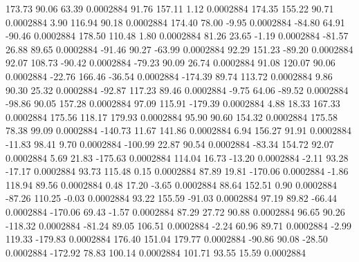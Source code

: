       173.73       90.06       63.39     0.0002884
       91.76      157.11        1.12     0.0002884
      174.35      155.22       90.71     0.0002884
        3.90      116.94       90.18     0.0002884
      174.40       78.00       -9.95     0.0002884
      -84.80       64.91      -90.46     0.0002884
      178.50      110.48        1.80     0.0002884
       81.26       23.65       -1.19     0.0002884
      -81.57       26.88       89.65     0.0002884
      -91.46       90.27      -63.99     0.0002884
       92.29      151.23      -89.20     0.0002884
       92.07      108.73      -90.42     0.0002884
      -79.23       90.09       26.74     0.0002884
       91.08      120.07       90.06     0.0002884
      -22.76      166.46      -36.54     0.0002884
     -174.39       89.74      113.72     0.0002884
        9.86       90.30       25.32     0.0002884
      -92.87      117.23       89.46     0.0002884
       -9.75       64.06      -89.52     0.0002884
      -98.86       90.05      157.28     0.0002884
       97.09      115.91     -179.39     0.0002884
        4.88       18.33      167.33     0.0002884
      175.56      118.17      179.93     0.0002884
       95.90       90.60      154.32     0.0002884
      175.58       78.38       99.09     0.0002884
     -140.73       11.67      141.86     0.0002884
        6.94      156.27       91.91     0.0002884
      -11.83       98.41        9.70     0.0002884
     -100.99       22.87       90.54     0.0002884
      -83.34      154.72       92.07     0.0002884
        5.69       21.83     -175.63     0.0002884
      114.04       16.73      -13.20     0.0002884
       -2.11       93.28      -17.17     0.0002884
       93.73      115.48        0.15     0.0002884
       87.89       19.81     -170.06     0.0002884
       -1.86      118.94       89.56     0.0002884
        0.48       17.20       -3.65     0.0002884
       88.64      152.51        0.90     0.0002884
      -87.26      110.25       -0.03     0.0002884
       93.22      155.59      -91.03     0.0002884
       97.19       89.82      -66.44     0.0002884
     -170.06       69.43       -1.57     0.0002884
       87.29       27.72       90.88     0.0002884
       96.65       90.26     -118.32     0.0002884
      -81.24       89.05      106.51     0.0002884
       -2.24       60.96       89.71     0.0002884
       -2.99      119.33     -179.83     0.0002884
      176.40      151.04      179.77     0.0002884
      -90.86       90.08      -28.50     0.0002884
     -172.92       78.83      100.14     0.0002884
      101.71       93.55       15.59     0.0002884
